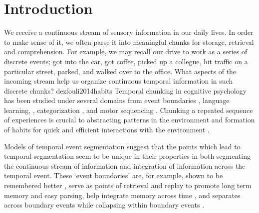 \section{Introduction}
We receive a continuous stream of sensory information in our daily lives. In order to make sense of it, we often parse it into meaningful chunks for storage, retrieval and comprehension. For example, we may recall our drive to work as a series of discrete events; got into the car, got coffee, picked up a collegue, hit traffic on a particular street, parked, and walked over to the office. What aspects of the incoming stream help us organize continuous temporal information in such discrete chunks? 
dezfouli2014habits
Temporal chunking in cognitive psychology has been studied under several domains from event boundaries \cite{clewett2019transcending, zacks2007event, rouhani2020reward,rouhani2018dissociable,dubrow2013influence,baldwin2008segmenting}, language learning, \cite{romberg2010statistical,knowlton1992intact}, categorization \cite{unger2022ready,gabay2015incidental}, and motor sequencing \cite{bera2021motor, tremblay2010movement, savalia2016unified,ostlund2009evidence}. Chunking a repeated sequence of experiences is crucial to abstracting patterns in the environment and formation of habits for quick and efficient interactions with the environment \cite{dezfouli2012habits, smith2016habit,dolan2013goals, dezfouli2014habits, gershman2010learning, botvinick2012hierarchical}. 

Models of temporal event segmentation suggest that the points which lead to temporal segmentation seem to be unique in their properties in both segmenting the continuous stream of information and integration of information across the temporal event. These `event boundaries' are, for example, shown to be remembered better \cite{swallow2009event,rouhani2018dissociable,rouhani2018dissociable, zacks2020event, radvansky2017event, heusser2018perceptual}, serve as points of retrieval \cite{michelmann2023evidence} and replay to promote long term memory \cite{hahamy2023human, sols2017event} and easy parsing, help integrate memory across time \cite{clewett2019transcending}, and separates across boundary events while collapsing within boundary events \cite{clewett2019transcending, lositsky2016neural,ezzyat2014similarity, brunec2018boundaries}. 

